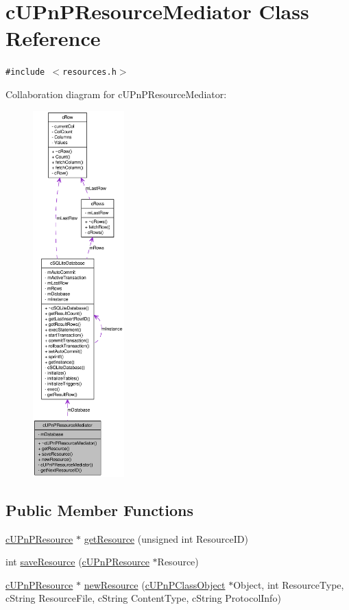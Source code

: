 \hypertarget{classcUPnPResourceMediator}{
\section{cUPnPResourceMediator Class Reference}
\label{classcUPnPResourceMediator}
}
{\tt \#include $<$resources.h$>$}

Collaboration diagram for cUPnPResourceMediator:\nopagebreak
\begin{figure}[H]
\begin{center}
\leavevmode
\includegraphics[height=400pt]{classcUPnPResourceMediator__coll__graph}
\end{center}
\end{figure}
\subsection*{Public Member Functions}
\begin{CompactItemize}
\item 
\hyperlink{classcUPnPResource}{cUPnPResource} $\ast$ \hyperlink{classcUPnPResourceMediator_9d4d8cc5eafb18b13ad7d14793d3f9de}{getResource} (unsigned int ResourceID)
\item 
int \hyperlink{classcUPnPResourceMediator_a633cef46d5cae9aecec05ea28d7c14e}{saveResource} (\hyperlink{classcUPnPResource}{cUPnPResource} $\ast$Resource)
\item 
\hyperlink{classcUPnPResource}{cUPnPResource} $\ast$ \hyperlink{classcUPnPResourceMediator_14367dd7e160f6c6812279b84a4fa8e2}{newResource} (\hyperlink{classcUPnPClassObject}{cUPnPClassObject} $\ast$Object, int ResourceType, cString ResourceFile, cString ContentType, cString ProtocolInfo)
\end{CompactItemize}
